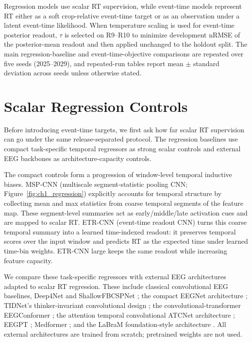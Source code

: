\documentclass[12pt]{article}
\begin{document}
Regression models use scalar RT supervision, while event-time models represent RT either as a soft crop-relative event-time target or as an observation under a latent event-time likelihood. When temperature scaling is used for event-time posterior readout, \(\tau\) is selected on R9--R10 to minimize development nRMSE of the posterior-mean readout and then applied unchanged to the holdout split. The main regression-baseline and event-time-objective comparisons are repeated over five seeds (2025--2029), and repeated-run tables report mean $\pm$ standard deviation across seeds unless otherwise stated.

\section{Scalar Regression Controls}
\label{sec:baseline_regression}

Before introducing event-time targets, we first ask how far scalar RT supervision can go under the same release-separated protocol. The regression baselines use compact task-specific temporal regressors as strong scalar controls and external EEG backbones as architecture-capacity controls.

The compact controls form a progression of window-level temporal inductive biases. MSP-CNN (multiscale segment-statistic pooling CNN; Figure~\ref{fig:ch1_regression}) explicitly accounts for temporal structure by collecting mean and max statistics from coarse temporal segments of the feature map. These segment-level summaries act as early/middle/late activation cues and are mapped to scalar RT. ETR-CNN (event-time readout CNN) turns this coarse temporal summary into a learned time-indexed readout: it preserves temporal scores over the input window and predicts RT as the expected time under learned time-bin weights. ETR-CNN large keeps the same readout while increasing feature capacity.

We compare these task-specific regressors with external EEG architectures adapted to scalar RT regression. These include classical convolutional EEG baselines, Deep4Net and ShallowFBCSPNet \citep{braindecode}; the compact EEGNet architecture \citep{lawhern2018eegnet}; TIDNet's thinker-invariant convolutional design \citep{kostas2020thinkerinvariance}; the convolutional-transformer EEGConformer \citep{song2023eegconformer}; the attention temporal convolutional ATCNet architecture \citep{altaheri2022atcnet}; EEGPT \citep{wang2024eegpt}; Medformer \citep{wang2024medformer}; and the LaBraM foundation-style architecture \citep{Jiang2024LaBraM}. All external architectures are trained from scratch; pretrained weights are not used.
\end{document}
